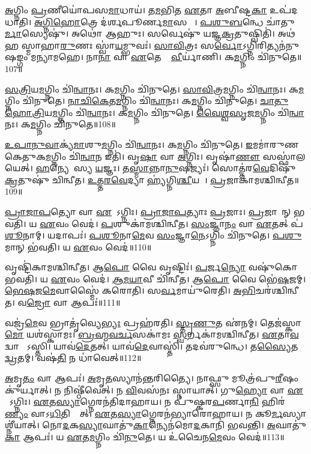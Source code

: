 \ul{𑌅}𑌗𑍍𑌨𑌿𑌂 \ul{𑌪𑍍𑌰}𑌣𑍀𑌯𑍋॑𑌪𑌸\ul{𑌮𑌾}𑌧𑌾𑌯॑। 𑌤\ul{𑌮}𑌭𑌿𑌤 \ul{𑌏}𑌤𑌾 \ul{𑌅}𑌬𑍀𑌷𑍍𑌟\ul{𑌕𑌾} 𑌉𑌪॑𑌦𑌧𑌾𑌤𑌿। 
\ul{𑌅}\ul{𑌗𑍍𑌨𑌿}\ul{𑌹𑍋}𑌤𑍍𑌰𑍇 𑌦॑𑌰𑍍𑌶𑌪𑍂𑌰𑍍𑌣\ul{𑌮𑌾}𑌸𑌯𑍋𑌃᳚। \ul{𑌪}\ul{𑌶𑍁}\ul{𑌬}𑌨𑍍𑌧𑍇 𑌚𑌾॑𑌤𑍁\ul{𑌰𑍍𑌮𑌾}𑌸𑍍𑌯𑍇𑌷𑍁॑। 
𑌅𑌥𑍋॑ 𑌆𑌹𑍁𑌃। 𑌸𑌰𑍍𑌵𑍇𑌷𑍁॑ 𑌯𑌜𑍍𑌞\ul{𑌕𑍍𑌰}𑌤𑍁𑌷𑍍𑌵𑌿𑌤𑌿॑। 
𑌅𑌥॑ 𑌹 𑌸𑍍𑌮𑌾𑌹𑌾\ul{𑌰𑍁}𑌣𑌃 𑌸𑍍𑌵𑌾॑\ul{𑌯}𑌮𑍍𑌭𑍁𑌵𑌃॑। \ul{𑌸𑌾}\ul{𑌵𑌿}𑌤𑍍𑌰𑌃 𑌸\ul{𑌰𑍍𑌵𑍋}𑌽𑌗𑍍𑌨𑌿𑌰𑌿𑌤𑍍𑌯𑌨॑𑌨𑍁𑌷𑌙𑍍𑌗𑌂 𑌮𑌨𑍍𑌯𑌾𑌮𑌹𑍇। 
𑌨𑌾\ul{𑌨𑌾} 𑌵𑌾 \ul{𑌏}𑌤𑍇𑌷𑌾𑌂᳚ \ul{𑌵𑍀}𑌰𑍍𑌯𑌾॑𑌣𑌿। 𑌕\ul{𑌮}𑌗𑍍𑌨𑌿𑌂 𑌚𑌿॑𑌨𑍁𑌤𑍇॥107॥


\ul{𑌸}\ul{𑌤𑍍𑌰𑌿}𑌯\ul{𑌮}𑌗𑍍𑌨𑌿𑌂 𑌚𑌿॑\ul{𑌨𑍍𑌵𑌾}𑌨𑌃। 𑌕\ul{𑌮}𑌗𑍍𑌨𑌿𑌂 𑌚𑌿॑𑌨𑍁𑌤𑍇। 
\ul{𑌸𑌾}\ul{𑌵𑌿}𑌤𑍍𑌰\ul{𑌮}𑌗𑍍𑌨𑌿𑌂 𑌚𑌿॑\ul{𑌨𑍍𑌵𑌾}𑌨𑌃। 𑌕\ul{𑌮}𑌗𑍍𑌨𑌿𑌂 𑌚𑌿॑𑌨𑍁𑌤𑍇। 
\ul{𑌨𑌾}\ul{𑌚𑌿}\ul{𑌕𑍇}𑌤\ul{𑌮}𑌗𑍍𑌨𑌿𑌂 𑌚𑌿॑\ul{𑌨𑍍𑌵𑌾}𑌨𑌃। 𑌕\ul{𑌮}𑌗𑍍𑌨𑌿𑌂 𑌚𑌿॑𑌨𑍁𑌤𑍇। 
\ul{𑌚𑌾}\ul{𑌤𑍁}\ar{}\ul{𑌹𑍋}\ul{𑌤𑍍𑌰𑌿}𑌯\-\ul{𑌮}𑌗𑍍𑌨𑌿𑌂 𑌚𑌿॑\ul{𑌨𑍍𑌵𑌾}𑌨𑌃। 𑌕\ul{𑌮}𑌗𑍍𑌨𑌿𑌂 𑌚𑌿॑𑌨𑍁𑌤𑍇। 
\ul{𑌵𑍈}\ul{𑌶𑍍𑌵}\ul{𑌸𑍃}𑌜\ul{𑌮}𑌗𑍍𑌨𑌿𑌂 𑌚𑌿॑\ul{𑌨𑍍𑌵𑌾}𑌨𑌃। 𑌕\ul{𑌮}𑌗𑍍𑌨𑌿𑌂 𑌚𑌿॑𑌨𑍁𑌤𑍇॥108॥


\ul{𑌉}\ul{𑌪𑌾}\ul{𑌨𑍁}\ul{𑌵𑌾}𑌕𑍍𑌯॑\ul{𑌮𑌾}𑌶𑍁\ul{𑌮}𑌗𑍍𑌨𑌿𑌂 𑌚𑌿॑\ul{𑌨𑍍𑌵𑌾}𑌨𑌃। 𑌕\ul{𑌮}𑌗𑍍𑌨𑌿𑌂 𑌚𑌿॑𑌨𑍁𑌤𑍇। 
\ul{𑌇}𑌮𑌮𑌾॑𑌰𑍁𑌣𑌕𑍇𑌤𑍁𑌕\-\ul{𑌮}𑌗𑍍𑌨𑌿𑌂 𑌚𑌿॑\ul{𑌨𑍍𑌵𑌾}𑌨 𑌇𑌤𑌿॑। 𑌵𑍃\ul{𑌷𑌾} 𑌵𑌾 \ul{𑌅}𑌗𑍍𑌨𑌿𑌃। 
𑌵𑍃𑌷𑌾॑\ul{𑌣𑍗} 𑌸𑌸𑍍𑌫𑌾॑𑌲𑌯𑍇𑌤𑍍‌। \ul{𑌹}𑌨𑍍𑌯𑍇𑌤𑌾᳚𑌸𑍍𑌯 \ul{𑌯}𑌜𑍍𑌞𑌃। 
𑌤\ul{𑌸𑍍𑌮𑌾}𑌨𑍍𑌨𑌾\ul{𑌨𑍁}𑌷𑌜𑍍𑌯𑌃॑। 𑌸𑍋𑌤𑍍𑌤॑𑌰\ul{𑌵𑍇}𑌦𑌿𑌷𑍁॑ \ul{𑌕𑍍𑌰}𑌤𑍁𑌷𑍁॑ 𑌚𑌿𑌨𑍍𑌵𑍀𑌤। 
\ul{𑌉}\ul{𑌤𑍍𑌤}\ul{𑌰}\ul{𑌵𑍇}𑌦𑍍𑌯𑌾 𑌹𑍍𑌯॑𑌗𑍍𑌨𑌿\ul{𑌶𑍍𑌚𑍀}𑌯𑌤𑍇᳚। \ul{𑌪𑍍𑌰}𑌜𑌾𑌕𑌾॑𑌮𑌶𑍍𑌚𑌿𑌨𑍍𑌵𑍀𑌤॥109॥


\ul{𑌪𑍍𑌰𑌾}\ul{𑌜𑌾}\ul{𑌪}𑌤𑍍𑌯𑍋 𑌵𑌾 \ul{𑌏}𑌷𑍋᳚𑌽𑌗𑍍𑌨𑌿𑌃। \ul{𑌪𑍍𑌰𑌾}\ul{𑌜𑌾}\ul{𑌪}𑌤𑍍𑌯𑌾𑌃 \ul{𑌪𑍍𑌰}𑌜𑌾𑌃। 
\ul{𑌪𑍍𑌰}𑌜𑌾𑌵𑌾᳚𑌨𑍍‌ 𑌭𑌵𑌤𑌿। 𑌯 \ul{𑌏}𑌵𑌂 𑌵𑍇𑌦॑। 
\ul{𑌪}𑌶𑍁𑌕𑌾॑𑌮𑌶𑍍𑌚𑌿𑌨𑍍𑌵𑍀𑌤। \ul{𑌸𑌂}𑌜𑍍𑌞𑌾\ul{𑌨𑌂} 𑌵𑌾 \ul{𑌏}𑌤𑌤𑍍‌ 𑌪॑\ul{𑌶𑍂}𑌨𑌾𑌮𑍍‌। 
𑌯𑌦𑌾𑌪𑌃॑। \ul{𑌪}\ul{𑌶𑍂}𑌨𑌾\ul{𑌮𑍇}𑌵 \ul{𑌸𑌂}𑌜𑍍𑌞𑌾\ul{𑌨𑍇}𑌽𑌗𑍍𑌨𑌿𑌂 𑌚𑌿॑𑌨𑍁𑌤𑍇। 
\ul{𑌪}\ul{𑌶𑍁}𑌮𑌾𑌨𑍍 𑌭॑𑌵𑌤𑌿। 𑌯 \ul{𑌏}𑌵𑌂 𑌵𑍇𑌦॑॥110॥


𑌵𑍃𑌷𑍍𑌟𑌿॑𑌕𑌾𑌮𑌶𑍍𑌚𑌿𑌨𑍍𑌵𑍀𑌤। 𑌆\ul{𑌪𑍋} 𑌵𑍈 𑌵𑍃𑌷𑍍𑌟𑌿𑌃॑। 
\ul{𑌪}𑌰𑍍𑌜\ul{𑌨𑍍𑌯𑍋} 𑌵\ur{}𑌷𑍁॑𑌕𑍋 𑌭𑌵𑌤𑌿। 𑌯 \ul{𑌏}𑌵𑌂 𑌵𑍇𑌦॑। 
\ul{𑌆}\ul{𑌮}\ul{𑌯𑌾}𑌵𑍀 𑌚𑌿॑𑌨𑍍𑌵𑍀𑌤। 𑌆\ul{𑌪𑍋} 𑌵𑍈 𑌭𑍇॑\ul{𑌷}𑌜𑌮𑍍‌। 
\ul{𑌭𑍇}\ul{𑌷}𑌜\ul{𑌮𑍇}𑌵𑌾𑌸𑍍𑌮𑍈॑ 𑌕𑌰𑍋𑌤𑌿। 𑌸\ul{𑌰𑍍𑌵}𑌮𑌾𑌯𑍁॑𑌰𑍇𑌤𑌿। 
\ul{𑌅}\ul{𑌭𑌿}𑌚𑌰॑𑌶𑍍𑌚𑌿𑌨𑍍𑌵𑍀𑌤। 𑌵\ul{𑌜𑍍𑌰𑍋} 𑌵𑌾 𑌆𑌪𑌃॑॥111॥


𑌵𑌜𑍍𑌰॑\ul{𑌮𑍇}𑌵 𑌭𑍍𑌰𑌾𑌤𑍃॑𑌵𑍍𑌯𑍇\ul{𑌭𑍍𑌯𑌃} 𑌪𑍍𑌰𑌹॑𑌰𑌤𑌿। \ul{𑌸𑍍𑌤𑍃}\ul{𑌣𑍁}𑌤 𑌏॑𑌨𑌮𑍍‌। 
𑌤𑍇𑌜॑𑌸𑍍𑌕𑌾\ul{𑌮𑍋} 𑌯𑌶॑𑌸𑍍𑌕𑌾𑌮𑌃। \ul{𑌬𑍍𑌰}\ul{𑌹𑍍𑌮}\ul{𑌵}\ul{𑌰𑍍𑌚}𑌸𑌕𑌾॑𑌮𑌃 \ul{𑌸𑍍𑌵}𑌰𑍍𑌗𑌕𑌾॑𑌮𑌶𑍍𑌚𑌿𑌨𑍍𑌵𑍀𑌤। 
\ul{𑌏}𑌤𑌾\ul{𑌵}𑌦𑍍𑌵𑌾 𑌵𑌾᳚𑌽𑌸𑍍𑌤𑌿। 𑌯𑌾𑌵॑\ul{𑌦𑍇}𑌤𑌤𑍍‌। 
𑌯𑌾𑌵॑\ul{𑌦𑍇}𑌵𑌾𑌸𑍍𑌤𑌿॑। 𑌤𑌦𑌵॑𑌰𑍁𑌨𑍍𑌧𑍇। 
𑌤\ul{𑌸𑍍𑌯𑍈}𑌤\ul{𑌦𑍍𑌵𑍍𑌰}𑌤𑌮𑍍‌। 𑌵\ur{}𑌷॑\ul{𑌤𑌿} 𑌨 𑌧𑌾॑𑌵𑍇𑌤𑍍‌॥112॥


\ul{𑌅}𑌮𑍃\ul{𑌤𑌂} 𑌵𑌾 𑌆𑌪𑌃॑। \ul{𑌅}𑌮𑍃\ul{𑌤}𑌸𑍍𑌯𑌾𑌨॑𑌨𑍍𑌤𑌰𑌿𑌤𑍍𑌯𑍈। 
𑌨𑌾𑌫𑍍𑌸𑍁 𑌮𑍂𑌤𑍍𑌰॑𑌪𑍁\ul{𑌰𑍀}𑌷𑌂 𑌕𑍁॑𑌰𑍍𑌯𑌾𑌤𑍍‌। 𑌨 𑌨𑌿𑌷𑍍𑌠𑍀॑𑌵𑍇𑌤𑍍‌। 
𑌨 \ul{𑌵𑌿}𑌵𑌸॑𑌨𑌃 𑌸𑍍𑌨𑌾𑌯𑌾𑌤𑍍‌। 𑌗𑍁\ul{𑌹𑍍𑌯𑍋} 𑌵𑌾 \ul{𑌏}𑌷𑍋᳚𑌽𑌗𑍍𑌨𑌿𑌃। 
\ul{𑌏}𑌤\ul{𑌸𑍍𑌯𑌾}𑌗𑍍𑌨𑍇𑌰𑌨॑𑌤𑌿𑌦𑌾𑌹𑌾𑌯। 𑌨 𑌪𑍁॑𑌷𑍍𑌕𑌰\ul{𑌪}𑌰𑍍𑌣𑌾\ul{𑌨𑌿} 𑌹𑌿𑌰॑\ul{𑌣𑍍𑌯𑌂} 𑌵𑌾𑌽\ul{𑌧𑌿}𑌤𑌿𑌷𑍍𑌠𑍇᳚𑌤𑍍‌। 
\ul{𑌏}𑌤\ul{𑌸𑍍𑌯𑌾}𑌗𑍍𑌨𑍇𑌰𑌨॑𑌭𑍍𑌯𑌾𑌰𑍋𑌹𑌾𑌯। 𑌨 𑌕𑍂\ul{𑌰𑍍𑌮}𑌸𑍍𑌯𑌾𑌶𑍍𑌨𑍀॑𑌯𑌾𑌤𑍍‌। 
𑌨𑍋\ul{𑌦}𑌕\ul{𑌸𑍍𑌯𑌾}𑌘𑌾𑌤𑍁॑\ul{𑌕𑌾}𑌨𑍍𑌯𑍇𑌨॑\-𑌮𑍋\ul{𑌦}𑌕𑌾𑌨𑌿॑ 𑌭𑌵𑌨𑍍𑌤𑌿। \ul{𑌅}𑌘𑌾𑌤𑍁॑\ul{𑌕𑌾} 𑌆𑌪𑌃॑। 
𑌯 \ul{𑌏}𑌤\ul{𑌮}𑌗𑍍𑌨𑌿𑌂 𑌚𑌿॑\ul{𑌨𑍁}𑌤𑍇। 𑌯 𑌉॑𑌚𑍈𑌨\ul{𑌮𑍇}𑌵𑌂 𑌵𑍇𑌦॑॥113॥\anuvakamend


